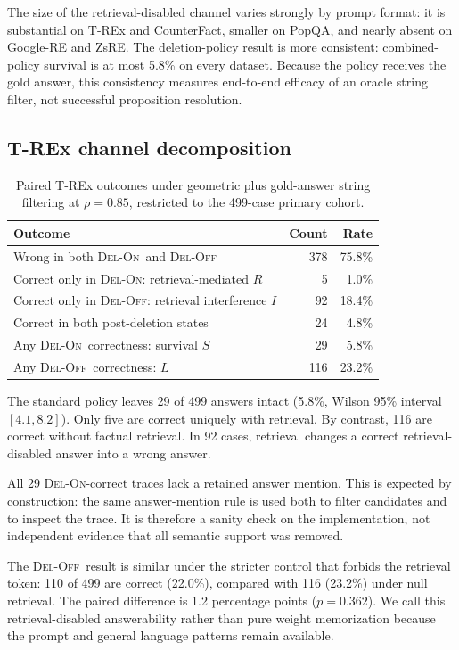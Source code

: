 \documentclass[11pt]{article}
\newcommand{\DELON}{\textsc{Del-On}}
\newcommand{\DELOFF}{\textsc{Del-Off}}
\newcommand{\pct}[1]{#1\%}
\begin{document}
The size of the retrieval-disabled channel varies strongly by prompt format:
it is substantial on T-REx and CounterFact, smaller on PopQA, and nearly
absent on Google-RE and ZsRE. The deletion-policy result is more consistent:
combined-policy survival is at most \pct{5.8} on every dataset. Because the
policy receives the gold answer, this consistency measures end-to-end
efficacy of an oracle string filter, not successful proposition resolution.

\subsection{T-REx channel decomposition}

\begin{table}[H]
\centering
\caption{Paired T-REx outcomes under geometric plus gold-answer string
filtering at \(\rho=0.85\), restricted to the 499-case primary cohort.}
\label{tab:three-state}
\begin{tabularx}{0.93\textwidth}{Yrr}
\toprule
Outcome & Count & Rate \\
\midrule
Wrong in both \DELON\ and \DELOFF & 378 & \pct{75.8} \\
Correct only in \DELON: retrieval-mediated \(R\) & 5 & \pct{1.0} \\
Correct only in \DELOFF: retrieval interference \(I\) & 92 & \pct{18.4} \\
Correct in both post-deletion states & 24 & \pct{4.8} \\
\midrule
Any \DELON\ correctness: survival \(S\) & 29 & \pct{5.8} \\
Any \DELOFF\ correctness: \(L\) & 116 & \pct{23.2} \\
\bottomrule
\end{tabularx}
\end{table}

The standard policy leaves 29 of 499 answers intact
(\pct{5.8}, Wilson 95\% interval \([4.1,8.2]\)). Only five are correct
uniquely with retrieval. By contrast, 116 are correct without factual
retrieval. In 92 cases, retrieval changes a correct retrieval-disabled answer
into a wrong answer.

All 29 \DELON-correct traces lack a retained answer mention. This is expected
by construction: the same answer-mention rule is used both to filter
candidates and to inspect the trace. It is therefore a sanity check on the
implementation, not independent evidence that all semantic support was
removed.

The \DELOFF\ result is similar under the stricter control that forbids the
retrieval token: 110 of 499 are correct (\pct{22.0}), compared with 116
(\pct{23.2}) under null retrieval. The paired difference is 1.2 percentage
points (\(p=0.362\)). We call this retrieval-disabled answerability rather
than pure weight memorization because the prompt and general language
patterns remain available.
\end{document}
